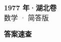 \documentclass[zihao=-4, a4paper]{ctexart}
\begin{document}
\begin{center}
  {\Large\bfseries 1977 年·湖北卷}\\[4pt]
  {\large 数学 · 简答版}
\end{center}
\medskip
{}

\clearpage
{}
\begin{center}{\Large\bfseries 答案速查}\end{center}
\medskip

\end{document}
